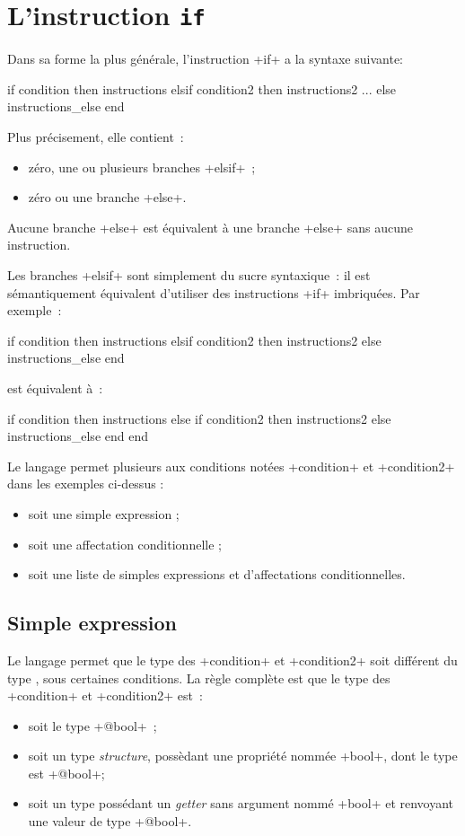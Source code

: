 \section{L'instruction \texttt{if}}


Dans sa forme la plus générale, l'instruction \ggs+if+ a la syntaxe suivante:

\begin{galgasbox}
if condition then
  instructions
elsif condition2 then
  instructions2
...
else
  instructions_else
end
\end{galgasbox}


Plus précisement, elle contient~:
\begin{itemize}
\item zéro, une ou plusieurs branches \ggs+elsif+~;
\item zéro ou une branche \ggs+else+.
\end{itemize}


Aucune branche \ggs+else+ est équivalent à une branche \ggs+else+ sans aucune instruction.


Les branches \ggs+elsif+ sont simplement du sucre syntaxique~: il est sémantiquement équivalent d'utiliser des instructions \ggs+if+ imbriquées. Par exemple~:
\begin{galgas}
if condition then
  instructions
elsif condition2 then
  instructions2
else
  instructions_else
end
\end{galgas}

est équivalent à~:
\begin{galgas}
if condition then
  instructions
else
  if condition2 then
    instructions2
  else
    instructions_else
  end
end
\end{galgas}

Le langage permet plusieurs aux conditions notées \ggs+condition+ et \ggs+condition2+ dans les exemples ci-dessus :
\begin{itemize}
  \item soit une simple expression ;
  \item soit une affectation conditionnelle ;
  \item soit une liste de simples expressions et d'affectations conditionnelles.
\end{itemize}


\subsection{Simple expression}
Le langage permet que le type des \ggs+condition+ et \ggs+condition2+ soit différent du type , sous certaines conditions. La règle complète est que le type des \ggs+condition+ et \ggs+condition2+ est~:
\begin{itemize}
\item soit le type \ggs+@bool+~;
\item soit un type \emph{structure}, possèdant une propriété nommée \ggs+bool+, dont le type est \ggs+@bool+; 
\item soit un type possédant un \emph{getter} sans argument nommé \ggs+bool+ et renvoyant une valeur de type \ggs+@bool+.
\end{itemize}

